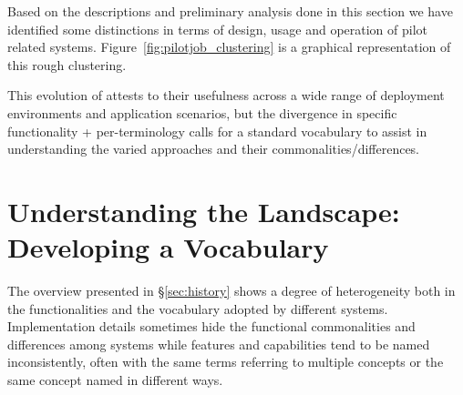 \documentclass{sig-alternate}
\begin{document}

Based on the descriptions and preliminary analysis done in this section we have
identified some distinctions in terms of design, usage and operation of pilot
related systems. Figure~\ref{fig:pilotjob_clustering} is a graphical
representation of this rough clustering.

This evolution of \pilotjobs attests to their usefulness across a wide range of
deployment environments and application scenarios, but the divergence in
specific functionality + per-\pilot terminology calls for a standard vocabulary
to assist in understanding the varied approaches and their
commonalities/differences.





\section{Understanding the Landscape: Developing a Vocabulary}
\label{sec:vocab}

The overview presented in \S\ref{sec:history} shows a degree of
heterogeneity both in the functionalities and the vocabulary adopted by
different \pilotjob systems. Implementation details sometimes hide the
functional commonalities and differences among \pilotjobs systems while
features and capabilities tend to be named inconsistently, often with
the same terms referring to multiple concepts or the same concept named
in different ways.
\end{document}
